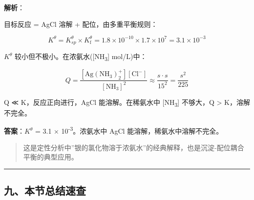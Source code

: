 \textbf{解析}：

目标反应 = AgCl 溶解 + 配位，由多重平衡规则：

\[K^\theta = K_{sp}^\theta \times K_{\mathrm f}^\theta = 1.8 \times 10^{-10} \times 1.7 \times 10^7 = 3.1 \times 10^{-3}\]

\(K^\theta\) 较小但不极小。在浓氨水({[}NH\textsubscript{3}{]}  mol/L)中：

\[Q = \frac{[\mathrm{Ag(NH_3)_2^+}][\mathrm{Cl^-}]}{[\mathrm{NH_3}]^2} \approx \frac{s \cdot s}{15^2} = \frac{s^2}{225}\]

Q ≪ K，反应正向进行，AgCl 能溶解。在稀氨水中 {[}NH\textsubscript{3}{]} 不够大，Q \textgreater{} K，溶解不完全。

\textbf{答案}：\(K^\theta\) = 3.1 × 10\textsuperscript{-3}。浓氨水中 AgCl 能溶解，稀氨水中溶解不完全。

\begin{quote}
这是定性分析中''银的氯化物溶于浓氨水''的经典解释，也是沉淀-配位耦合平衡的典型应用。
\end{quote}

\begin{center}\rule{0.5\linewidth}{0.5pt}\end{center}

\subsection{九、本节总结速查}\label{ux4e5dux672cux8282ux603bux7ed3ux901fux67e5}

